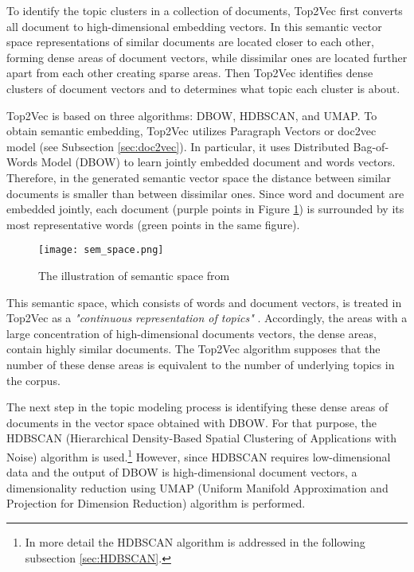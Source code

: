 \documentclass[fontsize=12pt,a4paper,twoside,openany]{scrbook}
\begin{document}
To identify the topic clusters in a collection of documents, Top2Vec first converts all document to high-dimensional embedding vectors. In this semantic vector space representations of similar documents are located closer to each other, forming dense areas of document vectors, while dissimilar ones are located further apart from each other creating sparse areas. Then Top2Vec identifies dense clusters of document vectors and to determines what topic each cluster is about.

Top2Vec is based on three algorithms: DBOW, HDBSCAN, and UMAP. To obtain semantic embedding, Top2Vec utilizes Paragraph Vectors or doc2vec model (see Subsection \ref{sec:doc2vec}). In particular, it uses Distributed Bag-of-Words Model (DBOW) to learn jointly embedded document and words vectors. Therefore, in the generated semantic vector space the distance between similar documents is smaller than between dissimilar ones. Since word and document are embedded jointly, each document (purple points in Figure \ref{fig:sem_space}) is surrounded by its most representative words (green points in the same figure).  

\begin{figure}[h]
\centering
\texttt{[image: sem\_space.png]}
\caption{The illustration of semantic space from \parencite{Angelov20}}
\label{fig:sem_space}
\end{figure}

This semantic space, which consists of words and document vectors, is treated in Top2Vec as a \emph{"continuous representation of topics"} \parencite[p.~3]{Angelov20}. Accordingly, the areas with a large concentration of high-dimensional documents vectors, the dense areas, contain highly similar documents. The Top2Vec algorithm supposes that the number of these dense areas is equivalent to the number of underlying topics in the corpus. 

The next step in the topic modeling process is identifying these dense areas of documents in the vector space obtained with DBOW. For that purpose, the HDBSCAN (Hierarchical Density-Based Spatial Clustering of Applications with Noise) \parencite{McInnes17b, McInnes17a} algorithm is used.\footnote{In more detail the HDBSCAN algorithm is addressed in the following subsection \ref{sec:HDBSCAN}.} However, since HDBSCAN requires low-dimensional data and the output of DBOW is high-dimensional document vectors, a dimensionality reduction using UMAP (Uniform Manifold Approximation and Projection for Dimension Reduction) algorithm \parencite{McInnes18, McInnes20} is performed.
\end{document}

